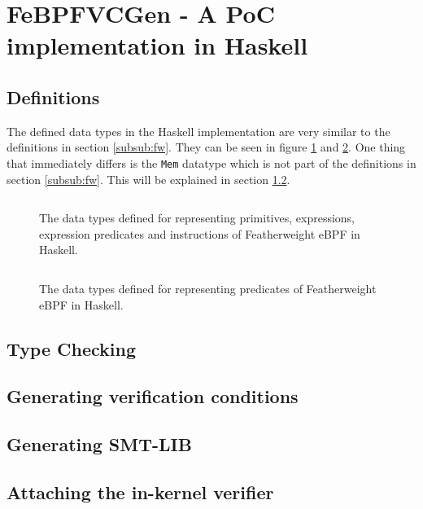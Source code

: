 \section{FeBPFVCGen - A PoC implementation in Haskell}
\label{sec:implementation}



\subsection{Definitions}
\label{subsec:definitions}

The defined data types in the Haskell implementation are very similar to the definitions in section \ref{subsub:fw}. They can be seen in figure \ref{snip:def1} and \ref{snip:def2}.
One thing that immediately differs is the \texttt{Mem} datatype which is not part of the definitions in section \ref{subsub:fw}. This will be explained in section \ref{subsec:type_checking}. 

\begin{figure}[ht]
  \centering
\inputminted[linenos]{haskell}{snippets/def1.hs}
  \caption{The data types defined for representing primitives, expressions, expression predicates and instructions of Featherweight eBPF in Haskell.}
  \label{snip:def1}
\end{figure}

\begin{figure}[ht]
  \centering
\inputminted[linenos]{haskell}{snippets/def2.hs}
  \caption{The data types defined for representing predicates of Featherweight eBPF in Haskell.}
  \label{snip:def2}
\end{figure}


\subsection{Type Checking}
\label{subsec:type_checking}




\subsection{Generating verification conditions}
\label{subsec:generating_verification_conditions}



\subsection{Generating SMT-LIB}
\label{subsec:generating_smt-lib}

\subsection{Attaching the in-kernel verifier}
\label{subsec:attaching_the_in-kernel_verifier}








